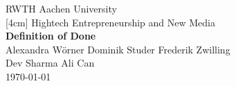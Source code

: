 \documentclass[twoside,12pt,a4paper]{article}
\begin{document}


\begin{titlepage}
 \begin{center}
  {\LARGE RWTH Aachen University}\\
  [4cm]
  {\Large Hightech Entrepreneurship and New Media \\[2cm]}
  {\huge\bf  Definition of Done \\[1.5cm]}
  {\large Alexandra Wörner \qquad
  		  Dominik Studer \qquad
  		  Frederik Zwilling \\ [0.15cm]
  		  Dev Sharma \qquad\qquad
  		  Ali Can
  } \\[0.5cm]
  \today \\[2cm]
\bigskip



\end{center}

\end{titlepage}
\end{document}
